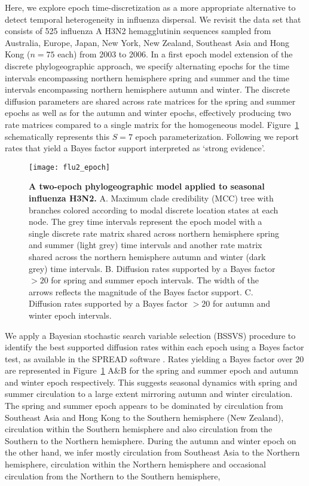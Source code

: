 Here, we explore epoch time-discretization as a more appropriate alternative to detect temporal heterogeneity in influenza dispersal.
We revisit the \citet{Bahl2011} data set that consists of 525 influenza A H3N2 hemagglutinin sequences sampled from  Australia, Europe, Japan, New York, New Zealand, Southeast Asia and Hong Kong ($n=75$ each) from 2003 to 2006.
In a first epoch model extension of the discrete phylogeographic approach, we specify alternating epochs for the time intervals encompassing northern hemisphere spring and summer and the time intervals encompassing northern hemisphere autumn and winter.
The discrete diffusion parameters are shared across rate matrices for the spring and summer epochs as well as for the autumn and winter epochs, effectively producing two rate matrices compared to a single matrix for the homogeneous model. Figure~\ref{fig:2EpochFlu} schematically represents this $S=7$ epoch parameterization. 
Following \cite{KassRaftery95} we report rates that yield a Bayes factor support interpreted as `strong evidence'.

\begin{figure}[H]
\centering
\texttt{[image: flu2\_epoch]} 
\caption{
{ \footnotesize 
{\bf A two-epoch phylogeographic model applied to seasonal influenza H3N2.} 
A. Maximum clade credibility (MCC) tree with branches colored according to modal discrete location states at each node. The grey time intervals represent the epoch model with a single discrete rate matrix shared across northern hemisphere spring and summer (light grey) time intervals and another rate matrix shared across the northern hemisphere autumn and winter (dark grey) time intervals. B. Diffusion rates supported by a Bayes factor $>20$ for spring and summer epoch intervals. The width of the arrows reflects the magnitude of the Bayes factor support. C. Diffusion rates supported by a Bayes factor $>20$ for autumn and winter epoch intervals.
}%
}
\label{fig:2EpochFlu}
\end{figure}

We apply a Bayesian stochastic search variable selection (BSSVS) procedure to identify the best supported diffusion rates within each epoch using a Bayes factor test, as available in the SPREAD software \citep{Bielejec2011}. Rates yielding a Bayes factor over 20 are represented in Figure~\ref{fig:2EpochFlu} A\&B for the spring and summer epoch and autumn and winter epoch respectively.
This suggests seasonal dynamics with spring and summer circulation to a large extent mirroring autumn and winter circulation.
The spring and summer epoch appears to be dominated by circulation from Southeast Asia and Hong Kong to the Southern hemisphere (New Zealand), circulation within the Southern hemisphere and also circulation from the Southern to the Northern hemisphere.
During the autumn and winter epoch on the other hand, we infer mostly circulation from Southeast Asia to the Northern hemisphere, circulation within the Northern hemisphere and occasional circulation from the Northern to the Southern hemisphere,

